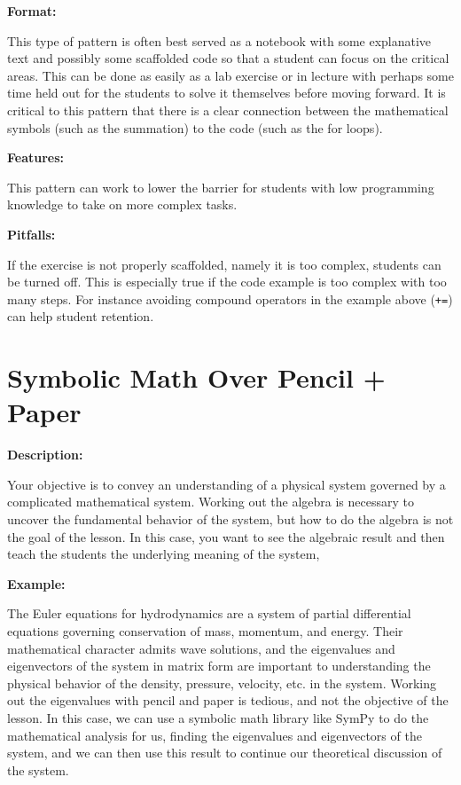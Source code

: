 \documentclass[]{book}
\begin{document}
\textbf{Format:}

This type of pattern is often best served as a notebook with some
explanative text and possibly some scaffolded code so that a student can
focus on the critical areas. This can be done as easily as a lab
exercise or in lecture with perhaps some time held out for the students
to solve it themselves before moving forward. It is critical to this
pattern that there is a clear connection between the mathematical
symbols (such as the summation) to the code (such as the for loops).

\textbf{Features:}

This pattern can work to lower the barrier for students with low
programming knowledge to take on more complex tasks.

\textbf{Pitfalls:}

If the exercise is not properly scaffolded, namely it is too complex,
students can be turned off. This is especially true if the code example
is too complex with too many steps. For instance avoiding compound
operators in the example above (\texttt{+=}) can help student retention.

\section{Symbolic Math Over Pencil +
Paper}\label{symbolic-math-over-pencil-paper}

\textbf{Description:}

Your objective is to convey an understanding of a physical system
governed by a complicated mathematical system. Working out the algebra
is necessary to uncover the fundamental behavior of the system, but how
to do the algebra is not the goal of the lesson. In this case, you want
to see the algebraic result and then teach the students the underlying
meaning of the system,

\textbf{Example:}

The Euler equations for hydrodynamics are a system of partial
differential equations governing conservation of mass, momentum, and
energy. Their mathematical character admits wave solutions, and the
eigenvalues and eigenvectors of the system in matrix form are important
to understanding the physical behavior of the density, pressure,
velocity, etc. in the system. Working out the eigenvalues with pencil
and paper is tedious, and not the objective of the lesson. In this case,
we can use a symbolic math library like SymPy to do the mathematical
analysis for us, finding the eigenvalues and eigenvectors of the system,
and we can then use this result to continue our theoretical discussion
of the system.
\end{document}
